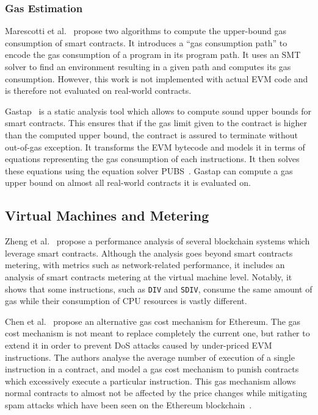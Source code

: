 \subsubsection*{Gas Estimation}
Marescotti et al.~\cite{10.1007/978-3-030-03427-6_33} propose two algorithms to compute the upper-bound gas consumption of smart contracts. It introduces a ``gas consumption path'' to encode the gas consumption of a program in its program path. It uses an SMT solver to find an environment resulting in a given path and computes its gas consumption. However, this work is not implemented with actual EVM code and is therefore not evaluated on real-world contracts.

Gastap~\cite{DBLP:journals/corr/abs-1811-10403} is a static analysis tool which allows to compute sound upper bounds for smart contracts. 
This ensures that if the gas limit given to the contract is higher than the computed upper bound, the contract is assured to terminate without out-of-gas exception.
It transforms the EVM bytecode and models it in terms of equations representing the gas consumption of each instructions.
It then solves these equations using the equation solver PUBS~\cite{10.1007/978-3-540-69166-2_15}.
Gastap can compute a gas upper bound on almost all real-world contracts it is evaluated on.


\subsection{Virtual Machines and Metering}
Zheng et al.~\cite{8449244} propose a performance analysis of several blockchain systems which leverage smart contracts. Although the analysis goes beyond smart contracts metering, with metrics such as network-related performance, it includes an analysis of smart contracts metering at the virtual machine level. Notably, it shows that some instructions, such as \lstinline{DIV} and \lstinline{SDIV}, consume the same amount of gas while their consumption of CPU resources is vastly different.

Chen et al.~\cite{Chen2017Metering} propose an alternative gas cost mechanism for Ethereum. The gas cost mechanism is not meant to replace completely the current one, but rather to extend it in order to prevent DoS attacks caused by under-priced EVM instructions. The authors analyse the average number of execution of a single instruction in a contract, and model a gas cost mechanism to punish contracts which excessively execute a particular instruction. This gas mechanism allows normal contracts to almost not be affected by the price changes while mitigating spam attacks which have been seen on the Ethereum blockchain~\cite{transaction-spam-attack}.
